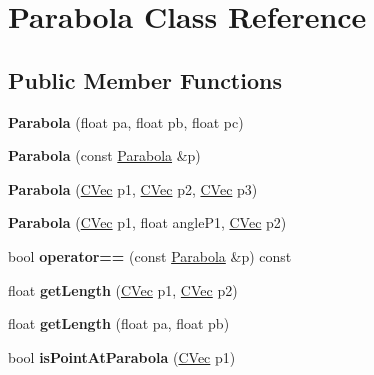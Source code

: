 \hypertarget{class_parabola}{
\section{Parabola Class Reference}
\label{class_parabola}
}
\subsection*{Public Member Functions}
\begin{DoxyCompactItemize}
\item 
\hypertarget{class_parabola_a0670374329e78a10f072d2de73af9ee0}{
{\bfseries Parabola} (float pa, float pb, float pc)}
\label{class_parabola_a0670374329e78a10f072d2de73af9ee0}

\item 
\hypertarget{class_parabola_afe4c028b80e43f75fef29b6cae9ae28b}{
{\bfseries Parabola} (const \hyperlink{class_parabola}{Parabola} \&p)}
\label{class_parabola_afe4c028b80e43f75fef29b6cae9ae28b}

\item 
\hypertarget{class_parabola_af64f938e49a0e320412462820ed2e7b4}{
{\bfseries Parabola} (\hyperlink{struct_vector_d2}{CVec} p1, \hyperlink{struct_vector_d2}{CVec} p2, \hyperlink{struct_vector_d2}{CVec} p3)}
\label{class_parabola_af64f938e49a0e320412462820ed2e7b4}

\item 
\hypertarget{class_parabola_ae43c41b8004425f96b3699f760e2fc10}{
{\bfseries Parabola} (\hyperlink{struct_vector_d2}{CVec} p1, float angleP1, \hyperlink{struct_vector_d2}{CVec} p2)}
\label{class_parabola_ae43c41b8004425f96b3699f760e2fc10}

\item 
\hypertarget{class_parabola_a3b6098878350739ae7d23d1e8c6dfc7f}{
bool {\bfseries operator==} (const \hyperlink{class_parabola}{Parabola} \&p) const }
\label{class_parabola_a3b6098878350739ae7d23d1e8c6dfc7f}

\item 
\hypertarget{class_parabola_af5ac267b11998998457ca0c8ef02265c}{
float {\bfseries getLength} (\hyperlink{struct_vector_d2}{CVec} p1, \hyperlink{struct_vector_d2}{CVec} p2)}
\label{class_parabola_af5ac267b11998998457ca0c8ef02265c}

\item 
\hypertarget{class_parabola_a69b58ee249efbc2470566d80ef8f5365}{
float {\bfseries getLength} (float pa, float pb)}
\label{class_parabola_a69b58ee249efbc2470566d80ef8f5365}

\item 
\hypertarget{class_parabola_a79398eb069c9794f915794bd086eed16}{
bool {\bfseries isPointAtParabola} (\hyperlink{struct_vector_d2}{CVec} p1)}
\label{class_parabola_a79398eb069c9794f915794bd086eed16}

\end{DoxyCompactItemize}
